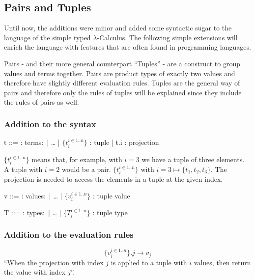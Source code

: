 \subsection{Pairs and Tuples}

Until now, the additions were minor and added some syntactic sugar to the language of
the simple typed $\lambda$-Calculus. The following simple extensions will enrich
the language with features that are often found in programming languages.

Pairs - and their more general counterpart ``Tuples'' - are a construct to group
values and terms together. Pairs are product types of exactly two values
and therefore have slightly different evaluation rules. Tuples are the general way
of pairs and therefore only the rules of tuples will be explained since they include
the rules of pairs as well.

\subsubsection{Addition to the syntax \cite{pierce2002ProgLang}}
\begin{bnfgrammar}
    t ::= : terms$\colon$
    | \dots
    | $\{t_i^{i \in 1..n}\}$ : tuple
    | t.i : projection
\end{bnfgrammar}\leavevmode\newline
$\{t_i^{i \in 1..n}\}$ means that, for example, with $i=3$ we have a tuple
of three elements. A tuple with $i=2$ would be a pair.
$\{t_i^{i \in 1..n}\} \text{ with } i=3 \mapsto \{t_1, t_2, t_3\}$.
The projection is needed to access the elements in a tuple at the given index.

\begin{bnfgrammar}
    v ::= : values$\colon$
    | \dots
    | $\{v_i^{i \in 1..n}\}$ : tuple value
\end{bnfgrammar}\leavevmode\newline

\begin{bnfgrammar}
    T ::= : types$\colon$
    | \dots
    | $\{T_i^{i \in 1..n}\}$ : tuple type
\end{bnfgrammar}\leavevmode\newline

\subsubsection{Addition to the evaluation rules \cite{pierce2002ProgLang}}
\begin{equation*}
    \tag{Tuple projection}
    \{v_i^{i \in 1..n}\} . j \rightarrow v_j
\end{equation*}
``When the projection with index $j$ is applied to a tuple with
$i$ values, then return the value with index $j$''.

